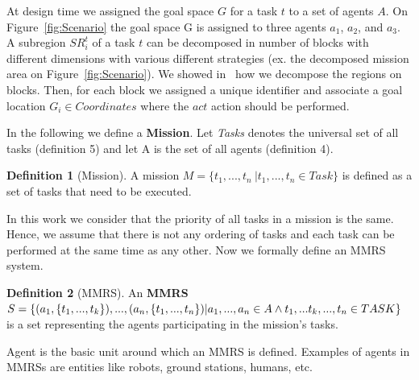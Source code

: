 \documentclass[journal]{IEEEtran}
\theoremstyle{definition}
\newtheorem{definition}{Definition}
\newcommand\patrizio[1]{\nb{Patrizio}{#1}}
\newcommand\ivano[1]{\nb{Ivano}{#1}}
\begin{document}


At design time we assigned the goal space $G$ for a task $t$ to a set of agents $A$. On Figure~\ref{fig:Scenario} the goal space G is assigned to three agents $a_1$, $a_2$, and $a_3$. A subregion $SR^t_i$ of a task $t$ can be decomposed in number of blocks with different dimensions with various different strategies (ex. the decomposed mission area on Figure~\ref{fig:Scenario}). We showed in~\cite{bozhinoski2015flyaq, di2013engineering} how we decompose the regions on blocks.  
Then, for each block we assigned a unique identifier and associate a goal location $G_i \in Coordinates$ where the $act$ action should be performed.






In the following we define a \textbf{Mission}.
Let \textit{Tasks} denotes the universal set of all tasks (definition 5\patrizio{please fix the ref!}) and let A is the set of all agents (definition 4).
\begin{definition}[Mission]
A mission $M=\{t_1, ... , t_n \ \vert t_1, ..., t_n \in Task \}$  is defined as a set of tasks that need to be executed.
\end{definition}

In this work we consider that the priority of all tasks in a mission is the same. Hence, we assume that there is not any ordering of tasks and each task can be performed at the same time as any other. 
Now we formally define an MMRS system. 

\begin{definition}[MMRS]
An \textbf{MMRS} 
$S=\{(a_1, \{t_1,...,t_k\}),... , \\(a_n,\{t_1,...,t_n\}) \vert a_1, ... , a_n \in A  \land t_1,...t_k,...,t_n  \in TASK\}$ is a set representing the agents participating in the mission's tasks.
\end{definition}



Agent is the basic unit around which an MMRS  is defined. Examples of agents in MMRSs are entities like robots, ground stations, humans, etc.\\
\end{document}

